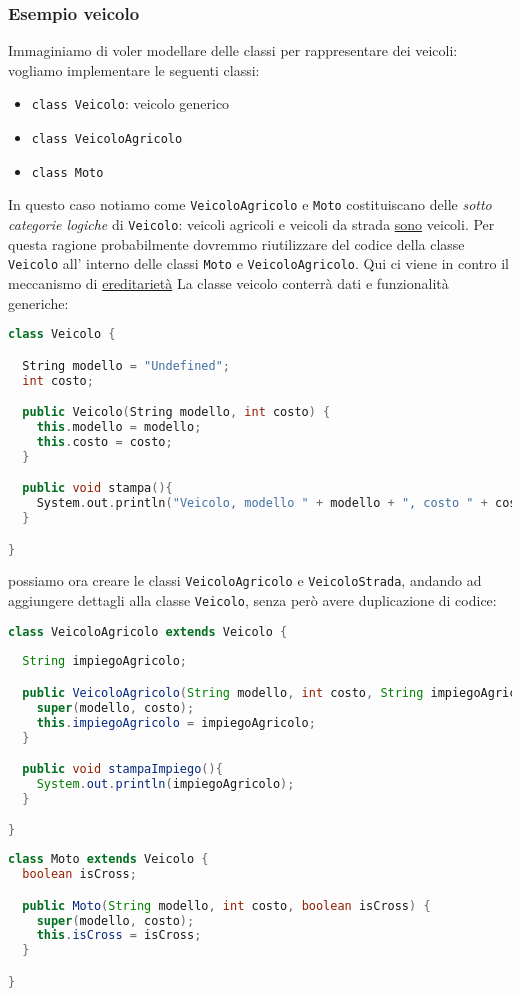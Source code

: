\subsubsection{Esempio veicolo}
Immaginiamo di voler modellare delle classi per rappresentare dei veicoli: vogliamo implementare le seguenti classi:
\begin{itemize}
	\item \verb|class Veicolo|: veicolo generico
	\item \verb|class VeicoloAgricolo|
	\item \verb|class Moto|
\end{itemize}
In questo caso notiamo come \verb|VeicoloAgricolo| e \verb|Moto| costituiscano delle \textit{sotto categorie logiche} di \verb|Veicolo|: veicoli agricoli e veicoli da strada \underline{sono} veicoli. Per questa ragione probabilmente dovremmo riutilizzare del codice della classe \verb|Veicolo| all' interno delle classi \verb|Moto| e \verb|VeicoloAgricolo|. Qui ci viene in contro il meccanismo di \underline{ereditarietà}
\vskip3mm
La classe veicolo conterrà dati e funzionalità generiche:
\vskip3mm
\begin{lstlisting}[language = c++, frame = none]
class Veicolo {

  String modello = "Undefined";
  int costo;

  public Veicolo(String modello, int costo) {
    this.modello = modello;
    this.costo = costo;
  }

  public void stampa(){
    System.out.println("Veicolo, modello " + modello + ", costo " + costo);
  }

}
\end{lstlisting}
\vskip3mm
possiamo ora creare le classi \verb|VeicoloAgricolo| e \verb|VeicoloStrada|, andando ad aggiungere dettagli alla classe \verb|Veicolo|, senza però avere duplicazione di codice:
\vskip3mm
\begin{lstlisting}[language = java, frame = none]
class VeicoloAgricolo extends Veicolo {
  
  String impiegoAgricolo;

  public VeicoloAgricolo(String modello, int costo, String impiegoAgricolo) {
    super(modello, costo);
    this.impiegoAgricolo = impiegoAgricolo;
  }

  public void stampaImpiego(){
    System.out.println(impiegoAgricolo);
  }

}
\end{lstlisting}

\begin{lstlisting}[language = java, frame = none]
class Moto extends Veicolo {
  boolean isCross;

  public Moto(String modello, int costo, boolean isCross) {
    super(modello, costo);
    this.isCross = isCross;
  }

}
\end{lstlisting}

